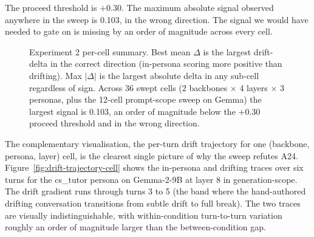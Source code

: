 The proceed threshold is $+0.30$. The maximum absolute signal observed anywhere in the sweep is 0.103, in the wrong direction. The signal we would have needed to gate on is missing by an order of magnitude across every cell.

\begin{figure}[H]
  \centering
  \caption{Experiment 2 per-cell summary. Best mean $\Delta$ is the largest drift-delta in the correct direction (in-persona scoring more positive than drifting). Max $|\Delta|$ is the largest absolute delta in any sub-cell regardless of sign. Across 36 swept cells (2 backbones $\times$ 4 layers $\times$ 3 personas, plus the 12-cell prompt-scope sweep on Gemma) the largest signal is 0.103, an order of magnitude below the $+0.30$ proceed threshold and in the wrong direction.}
  \label{fig:drift-trajectory-bars}
\end{figure}

The complementary visualisation, the per-turn drift trajectory for one (backbone, persona, layer) cell, is the clearest single picture of why the sweep refutes A24. Figure~\ref{fig:drift-trajectory-cell} shows the in-persona and drifting traces over six turns for the cs\_tutor persona on Gemma-2-9B at layer 8 in generation-scope. The drift gradient runs through turns 3 to 5 (the band where the hand-authored drifting conversation transitions from subtle drift to full break). The two traces are visually indistinguishable, with within-condition turn-to-turn variation roughly an order of magnitude larger than the between-condition gap.

